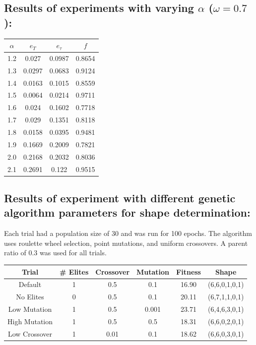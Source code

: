 \documentclass[12pt]{article}
\begin{document}
\subsection{Results of experiments with varying $\alpha$ ($\omega=0.7$):}
\begin{center}
 \begin{tabular}{||c c c c||} 
 \hline
 $\alpha$ & $e_T$ & $e_\tau$ & $f$ \\ [0.5ex] 
 \hline\hline
 1.2 & 0.027 & 0.0987 & 0.8654 \\ 
 \hline
 1.3 & 0.0297 & 0.0683 & 0.9124 \\
 \hline
 1.4 & 0.0163 & 0.1015 & 0.8559 \\
 \hline
 1.5 & 0.0064 & 0.0214 & 0.9711 \\
 \hline
 1.6 & 0.024 & 0.1602 & 0.7718 \\
 \hline
 1.7 & 0.029 & 0.1351 & 0.8118 \\
 \hline
 1.8 & 0.0158 & 0.0395 & 0.9481 \\
 \hline
 1.9 & 0.1669 & 0.2009 & 0.7821 \\
 \hline
 2.0 & 0.2168 & 0.2032 & 0.8036 \\
 \hline
 2.1 & 0.2691 & 0.122 & 0.9515 \\
 \hline
\end{tabular}
\end{center}
\subsection{Results of experiment with different genetic algorithm parameters for shape determination:}
Each trial had a population size of 30 and was run for 100 epochs. The algorithm uses roulette wheel selection, point mutations, and uniform crossovers. A parent ratio of 0.3 was used for all trials.
\begin{center}
 \begin{tabular}{||c c c c c c||} 
 \hline
 Trial & \# Elites & Crossover & Mutation & Fitness & Shape\\ [0.5ex] 
 \hline
 \hline
 Default & 1 & 0.5 & 0.1 & 16.90 & (6,6,0,1,0,1) \\ 
 \hline
 No Elites & 0 & 0.5 & 0.1 & 20.11 & (6,7,1,1,0,1) \\
 \hline
 Low Mutation & 1 & 0.5 & 0.001 & 23.71 & (6,4,6,3,0,1) \\
 \hline
 High Mutation & 1 & 0.5 & 0.5 & 18.31 & (6,6,0,2,0,1) \\
 \hline
 Low Crossover & 1 & 0.01 & 0.1 & 18.62 & (6,6,0,3,0,1) \\
 \hline
\end{tabular}
\end{center}
\end{document}
